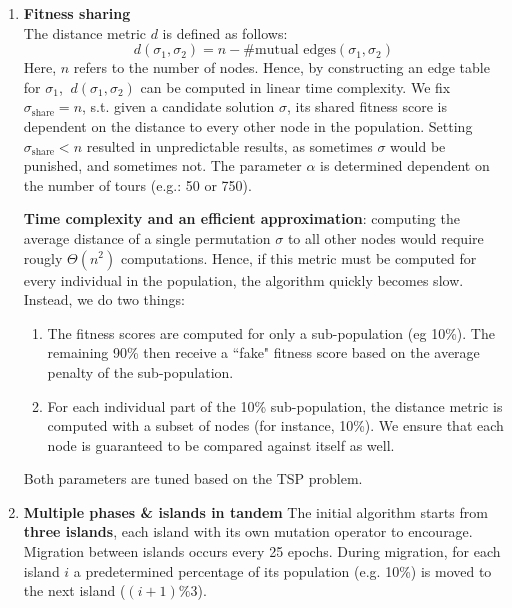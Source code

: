 \documentclass[a4paper,10pt]{article}
\begin{document}
	\begin{enumerate}
		\item \textbf{Fitness sharing} \\
		The distance metric $d$ is defined as follows: 
		$$d(\sigma_1, \sigma_2) = n - \# \text{mutual edges}(\sigma_1, \sigma_2)$$
		Here, $n$ refers to the number of nodes. Hence, by constructing an edge table for $\sigma_1$, $~d(\sigma_1, \sigma_2)$ can be computed in linear time complexity.
		We fix $\sigma_{\text{share}} = n$, s.t. given a candidate solution $\sigma$, its shared fitness score is dependent on the distance to every other node in the population. Setting $\sigma_{\text{share}} < n$ resulted in unpredictable results, as sometimes $\sigma$ would be punished, and sometimes not. The parameter $\alpha$ is determined dependent on the number of tours (e.g.: 50 or 750).
		
		\textbf{Time complexity and an efficient approximation}: computing the average distance of a single permutation $\sigma$ to all other nodes would require rougly $\Theta(n^2)$ computations. Hence, if this metric must be computed for every individual in the population, the algorithm quickly becomes slow. Instead, we do two things:
		\begin{enumerate}
			\item The fitness scores are computed for only a sub-population (eg 10\%). The remaining 90\% then receive a ``fake" fitness score based on the average penalty of the sub-population.
			\item For each individual part of the 10\% sub-population, the distance metric is computed with a subset of nodes (for instance, 10\%). We ensure that each node is guaranteed to be compared against itself as well.
		\end{enumerate}
		Both parameters are tuned based on the TSP problem.


		
		\item \textbf{Multiple phases \& islands in tandem}
		The initial algorithm starts from \textbf{three islands}, each island with its own mutation operator to encourage. Migration between islands occurs every 25 epochs. During migration, for each island $i$ a predetermined percentage of its population (e.g. 10\%) is moved to the next island ($(i+1) \%3$).
		

\end{enumerate}
\end{document}
